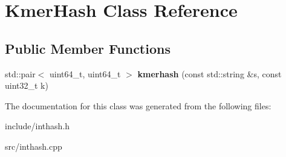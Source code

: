 \hypertarget{classKmerHash}{}\section{Kmer\+Hash Class Reference}
\label{classKmerHash}
\subsection*{Public Member Functions}
\begin{DoxyCompactItemize}
\item 
\mbox{\label{classKmerHash_a110032edf2d55ee5c850da81387db559}} 
std\+::pair$<$ uint64\+\_\+t, uint64\+\_\+t $>$ {\bfseries kmerhash} (const std\+::string \&s, const uint32\+\_\+t k)
\end{DoxyCompactItemize}


The documentation for this class was generated from the following files\+:\begin{DoxyCompactItemize}
\item 
include/inthash.\+h\item 
src/inthash.\+cpp\end{DoxyCompactItemize}
